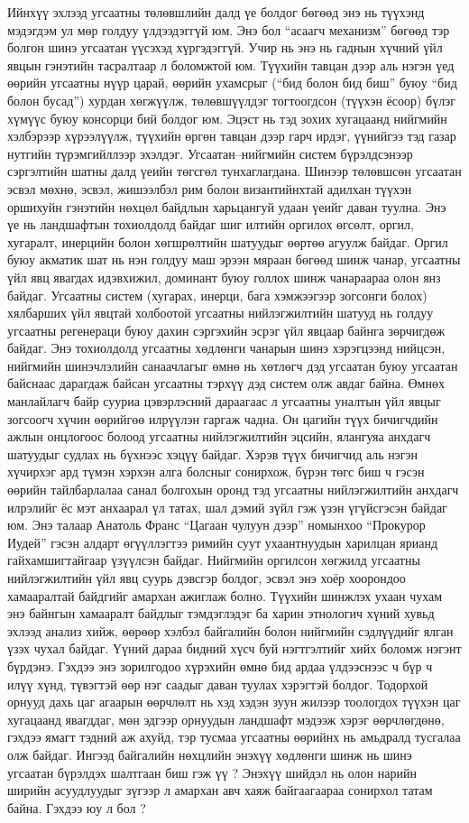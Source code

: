 Ийнхүү эхлээд угсаатны төлөвшлийн далд үе болдог бөгөөд энэ нь түүхэнд мэдэгдэм ул мөр голдуу үлдээдэггүй юм. Энэ бол “асаагч механизм” бөгөөд тэр болгон шинэ угсаатан үүсэхэд хүргэдэггүй. Учир нь энэ нь гаднын хүчний үйл явцын гэнэтийн тасралтаар л боломжтой юм. Түүхийн тавцан дээр аль нэгэн үед өөрийн угсаатны нүүр царай, өөрийн ухамсрыг (“бид болон бид биш” буюу “бид болон бусад”) хурдан хөгжүүлж, төлөвшүүлдэг тогтоогдсон (түүхэн ёсоор) бүлэг хүмүүс буюу консорци бий болдог юм. Эцэст нь тэд зохих хугацаанд нийгмийн хэлбэрээр хүрээлүүлж, түүхийн өргөн тавцан дээр гарч ирдэг, үүнийгээ тэд газар нутгийн түрэмгийллээр эхэлдэг. Угсаатан–нийгмийн систем бүрэлдсэнээр сэргэлтийн шатны далд үеийн төгсгөл тунхаглагдана. Шинээр төлөвшсөн угсаатан эсвэл мөхнө, эсвэл, жишээлбэл рим болон византийнхтай адилхан түүхэн оршихуйн гэнэтийн нөхцөл байдлын харьцангуй удаан үеийг даван туулна. Энэ үе нь ландшафтын тохиолдолд байдаг шиг илтийн оргилох өгсөлт, оргил, хугаралт, инерцийн болон хөгшрөлтийн шатуудыг өөртөө агуулж байдаг.
Оргил буюу акматик шат нь нэн голдуу маш эрээн мяраан бөгөөд шинж чанар, угсаатны үйл явц явагдах идэвхижил, доминант буюу голлох шинж чанараараа олон янз байдаг.
Угсаатны систем (хугарах, инерци, бага хэмжээгээр зогсонги болох) хялбарших үйл явцтай холбоотой угсаатны нийлэгжилтийн шатууд нь голдуу угсаатны регенераци буюу дахин сэргэхийн эсрэг үйл явцаар байнга зөрчигдөж байдаг. Энэ тохиолдолд угсаатны хөдлөнги чанарын шинэ хэрэгцээнд нийцсэн, нийгмийн шинэчлэлийн санаачлагыг өмнө нь хөтлөгч дэд угсаатан буюу угсаатан байснаас дарагдаж байсан угсаатны тэрхүү дэд систем олж авдаг байна. Өмнөх манлайлагч байр сууриа цэвэрлэсний дараагаас л угсаатны уналтын үйл явцыг зогсоогч хүчин өөрийгөө илрүүлэн гаргаж чадна.
Он цагийн түүх бичигчдийн ажлын онцлогоос болоод угсаатны нийлэгжилтийн эцсийн, ялангуяа анхдагч шатуудыг судлах нь бүхнээс хэцүү байдаг. Хэрэв түүх бичигчид аль нэгэн хүчирхэг ард түмэн хэрхэн алга болсныг сонирхож, бүрэн төгс биш ч гэсэн өөрийн тайлбарлалаа санал болгохын оронд тэд угсаатны нийлэгжилтийн анхдагч илрэлийг ёс мэт анхаарал үл татах, шал дэмий зүйл гэж үзэн үгүйсгэсэн байдаг юм. Энэ талаар Анатоль Франс “Цагаан чулуун дээр” номынхоо “Прокурор Иудей” гэсэн алдарт өгүүллэгтээ римийн суут ухаантнуудын харилцан ярианд гайхамшигтайгаар үзүүлсэн байдаг.
Нийгмийн оргилсон хөгжилд угсаатны нийлэгжилтийн үйл явц суурь дэвсгэр болдог, эсвэл энэ хоёр хоорондоо хамааралтай байдгийг амархан ажиглаж болно. Түүхийн шинжлэх ухаан чухам энэ байнгын хамааралт байдлыг тэмдэглэдэг ба харин этнологич хүний хувьд эхлээд анализ хийж, өөрөөр хэлбэл байгалийн болон нийгмийн сэдлүүдийг ялган үзэх чухал байдаг. Үүний дараа бидний хүсч буй нэгтгэлтийг хийх боломж нэгэнт бүрдэнэ. Гэхдээ энэ зорилгодоо хүрэхийн өмнө бид ардаа үлдээснээс ч бүр ч илүү хүнд, түвэгтэй өөр нэг саадыг даван туулах хэрэгтэй болдог. Тодорхой орнууд дахь цаг агаарын өөрчлөлт нь хэд хэдэн зуун жилээр тоологдох түүхэн цаг хугацаанд явагддаг, мөн эдгээр орнуудын ландшафт мэдээж хэрэг өөрчлөгдөнө, гэхдээ ямагт тэдний аж ахуйд, тэр тусмаа угсаатны өөрийнх нь амьдралд тусгалаа олж байдаг. Ингээд байгалийн нөхцлийн энэхүү хөдлөнги шинж нь шинэ угсаатан бүрэлдэх шалтгаан биш гэж үү ? Энэхүү шийдэл нь олон нарийн ширийн асуудлуудыг зүгээр л амархан авч хаяж байгаагаараа сонирхол татам байна. Гэхдээ юу л бол ?
